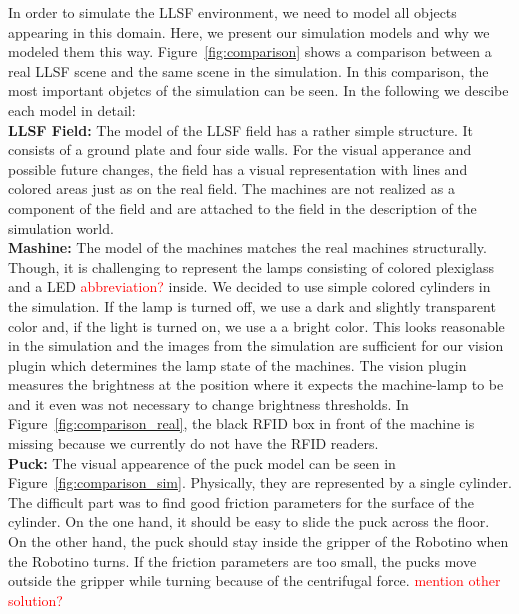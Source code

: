 In order to simulate the LLSF environment, we need to model all objects appearing in this domain. Here, we present our simulation models and why we modeled them this way. Figure~\ref{fig:comparison} shows a comparison between a real LLSF scene and the same scene in the simulation. In this comparison, the most important objetcs of the simulation can be seen. In the following we descibe each model in detail:\\
\textbf{LLSF Field:} The model of the LLSF field has a rather simple structure. It consists of a ground plate and four side walls. For the visual apperance and possible future changes, the field has a visual representation with lines and colored areas just as on the real field. The machines are not realized as a component of the field and are attached to the field in the description of the simulation world.\\
\textbf{Mashine:} The model of the machines matches the real machines structurally. Though, it is challenging to represent the lamps consisting of colored plexiglass and a LED \textcolor{red}{abbreviation?} inside. We decided to use simple colored cylinders in the simulation. If the lamp is turned off, we use a dark and slightly transparent color and, if the light is turned on, we use a a bright color. This looks reasonable in the simulation and the images from the simulation are sufficient for our vision plugin which determines the lamp state of the machines. The vision plugin measures the brightness at the position where it expects the machine-lamp to be and it even was not necessary to change brightness thresholds. In Figure~\ref{fig:comparison_real}, the black RFID box in front of the machine is missing because we currently do not have the RFID readers.\\
\textbf{Puck:} The visual appearence of the puck model can be seen in Figure~\ref{fig:comparison_sim}. Physically, they are represented by a single cylinder. The difficult part was to find good friction parameters for the surface of the cylinder. On the one hand, it should be easy to slide the puck across the floor. On the other hand, the puck should stay inside the gripper of the Robotino when the Robotino turns. If the friction parameters are too small, the pucks move outside the gripper while turning because of the centrifugal force. \textcolor{red}{mention other solution?}\\
